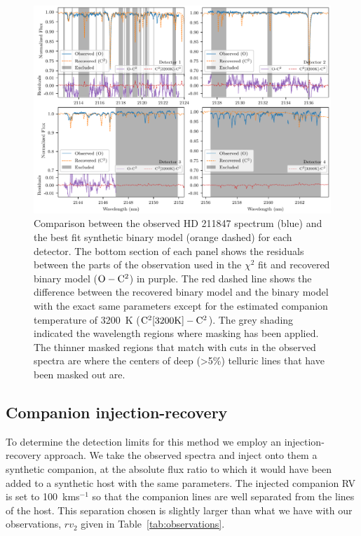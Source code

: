 \documentclass[fleqn,usenatbib]{mnras}
\begin{document}
\begin{figure}
    \centering
    \includegraphics[width=0.9\linewidth]{images/visualize_result_residuals.pdf}
    \caption{Comparison between the observed {HD 211847} spectrum (blue) and the best fit synthetic binary model (orange dashed) for each detector. The bottom section of each panel shows the residuals between the parts of the observation used in the \(\chi^2\) fit and recovered binary model (\(\rm O-C^2\)) in purple. The red dashed line shows the difference between the recovered binary model and the binary model with the exact same parameters except for the estimated companion temperature of 3200~K (\(\rm C^2[3200K]- C^2\)). The grey shading indicated the wavelength regions where masking has been applied. The thinner masked regions that match with cuts in the observed spectra are where the centers of deep (>5\%) telluric lines that have been masked out are.}
    \label{fig:visualinspection-hd2118471}
\end{figure}


\subsection{Companion injection-recovery}
\label{subsection:injection-recovery}
To determine the detection limits for this method we employ an injection-recovery approach. We take the observed spectra and inject onto them a synthetic companion, at the absolute flux ratio to which it would have been added to a synthetic host with the same parameters. The injected companion RV is set to 100~kms\(^{-1}\) so that the companion lines are well separated from the lines of the host. This separation chosen is slightly larger than what we have with our observations, \(rv_2\) given in Table~\ref{tab:observations}.
\end{document}
